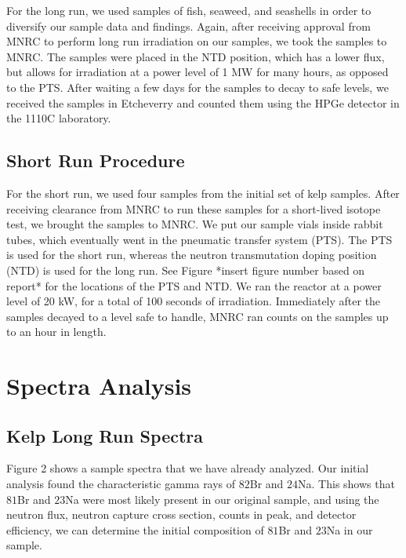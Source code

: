 \documentclass[]{article}
\begin{document}
For the long run, we used samples of fish, seaweed, and seashells in order to diversify our sample data and findings.  Again, after receiving approval from MNRC to perform long run irradiation on our samples, we took the samples to MNRC.  The samples were placed in the NTD position, which has a lower flux, but allows for irradiation at a power level of 1 MW for many hours, as opposed to the PTS.  After waiting a few days for the samples to decay to safe levels, we received the samples in Etcheverry and counted them using the HPGe detector in the 1110C laboratory.

\subsection{Short Run Procedure}
For the short run, we used four samples from the initial set of kelp samples.  After receiving clearance from MNRC to run these samples for a short-lived isotope test, we brought the samples to MNRC.  We put our sample vials inside rabbit tubes, which eventually went in the pneumatic transfer system (PTS).    The PTS is used for the short run, whereas the neutron transmutation doping position (NTD) is used for the long run.  See Figure *insert figure number based on report* for the locations of the PTS and NTD.  We ran the reactor at a power level of 20 kW, for a total of 100 seconds of irradiation. Immediately after the samples decayed to a level safe to handle, MNRC ran counts on the samples up to an hour in length.  



\section{Spectra Analysis}
\subsection{Kelp Long Run Spectra}
Figure 2 shows a sample spectra that we have already analyzed. Our initial analysis found the characteristic gamma rays of ${82}$Br and ${24}$Na. This shows that ${81}$Br and ${23}$Na were most likely present in our original sample, and using the neutron flux, neutron capture cross section, counts in peak, and detector efficiency, we can determine the initial composition of ${81}$Br and ${23}$Na in our sample.
\end{document}
